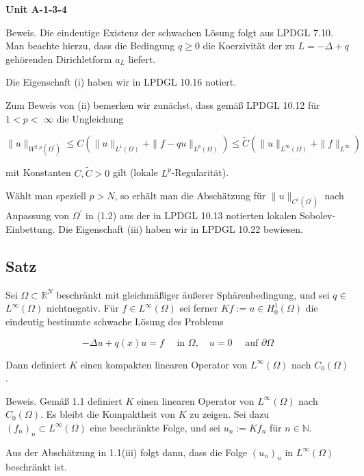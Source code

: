 \documentclass[10pt, letterpaper]{article}
\newenvironment{unit}[1]
  {\begin{unitbox}\textbf{Unit #1}\par\smallskip}
  {\end{unitbox}}
\begin{document}
    \begin{unit}{A-1-3-4}
      Beweis. Die eindeutige Existenz der schwachen Lösung folgt aus LPDGL 7.10. Man beachte hierzu, dass die Bedingung $q \geq 0$ die Koerzivität der zu $L=-\Delta+q$ gehörenden Dirichletform $a_{L}$ liefert.

      Die Eigenschaft (i) haben wir in LPDGL 10.16 notiert.
      
      Zum Beweis von (ii) bemerken wir zunächst, dass gemäß LPDGL 10.12 für $1<p<$ $\infty$ die Ungleichung
      
      $$
      \|u\|_{W^{2, p}\left(\Omega^{\prime}\right)} \leq C\left(\|u\|_{L^{1}(\Omega)}+\|f-q u\|_{L^{p}(\Omega)}\right) \leq \tilde{C}\left(\|u\|_{L^{\infty}(\Omega)}+\|f\|_{L^{\infty}}\right)
      $$
      
      mit Konstanten $C, \tilde{C}>0$ gilt (lokale $L^{p}$-Regularität).
      
      Wählt man speziell $p>N$, so erhält man die Abschätzung für $\|u\|_{C^{1}\left(\Omega^{\prime}\right)}$ nach Anpassung von $\Omega^{\prime}$ in (1.2) aus der in LPDGL 10.13 notierten lokalen Sobolev-Einbettung. Die Eigenschaft (iii) haben wir in LPDGL 10.22 bewiesen.
    \end{unit}


\subsection*{Satz}

Sei $\Omega \subset \mathbb{R}^{N}$ beschränkt mit gleichmäßiger äußerer Sphärenbedingung, und sei $q \in$ $L^{\infty}(\Omega)$ nichtnegativ. Für $f \in L^{\infty}(\Omega)$ sei ferner $K f:=u \in H_{0}^{1}(\Omega)$ die eindeutig bestimmte schwache Lösung des Problems

$$
-\Delta u+q(x) u=f \quad \text { in } \Omega, \quad u=0 \quad \text { auf } \partial \Omega
$$

Dann definiert $K$ einen kompakten linearen Operator von $L^{\infty}(\Omega)$ nach $C_{0}(\Omega)$.

    
Beweis. Gemäß 1.1 definiert $K$ einen linearen Operator von $L^{\infty}(\Omega)$ nach $C_{0}(\Omega)$. Es bleibt die Kompaktheit von $K$ zu zeigen. Sei dazu $\left(f_{n}\right)_{n} \subset L^{\infty}(\Omega)$ eine beschränkte Folge, und sei $u_{n}:=K f_{n}$ für $n \in \mathbb{N}$.

Aus der Abschätzung in 1.1(iii) folgt dann, dass die Folge $\left(u_{n}\right)_{n}$ in $L^{\infty}(\Omega)$ beschränkt ist.
\end{document}
